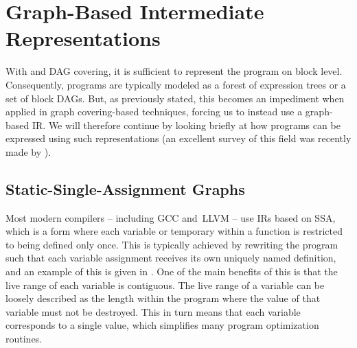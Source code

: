 \section{Graph-Based Intermediate Representations}

With  and \gls{DAG covering}, it is sufficient to
represent the \gls{program} on \gls{block} level.
%
Consequently, \glspl{program} are typically modeled as a \gls{forest} of
\glspl{expression tree} or a set of \glspl{block DAG}.
%
But, as previously stated, this becomes an impediment when applied in \gls{graph
  covering}-based techniques, forcing us to instead use a \gls{graph}-based
\glsdesc{IR}.
%
We will therefore continue by looking briefly at how \glspl{program} can be
expressed using such representations (an excellent survey of this field was
recently made by \textcite{StanierWatson:2013}).


\subsection{Static-Single-Assignment Graphs}

Most modern \glspl{compiler} -- including \gls{GCC} and~\gls{LLVM} -- use
\glspl{IR} based on \gls{SSA}, which is a form where each variable or
\gls{temporary} within a \gls{function} is restricted to being defined only
once.
%
This is typically achieved by rewriting the \gls{program} such that each
variable assignment receives its own uniquely named definition, and an example
of this is given in .
%
One of the main benefits of this is that the \gls{live range} of each variable
is contiguous.
%
The \gls{live range} of a variable can be loosely described as the length within
the \gls{program} where the value of that variable must not be destroyed.
%
This in turn means that each variable corresponds to a single value, which
simplifies many \gls{program} optimization routines.

